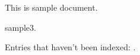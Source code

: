 \documentclass{article}
\newcommand*{\indexedlist}{}
\begin{document}
This is sample document.

\gls{sample3}.

\printglossaries

\glsxtraddallcrossrefs

Entries that haven't been indexed:
\forglsentries{\thislabel}{\xifinlist{\thislabel}{\indexedlist}{}{\space\thislabel}}.
\end{document}
